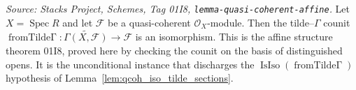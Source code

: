 \begin{lemma}
  \label{lem:qcoh_isIso_fromTildeGamma}
  \textit{Source: Stacks Project, Schemes, Tag 01I8, \texttt{lemma-quasi-coherent-affine}.}
  Let \(X = \operatorname{Spec} R\) and let \(\mathcal{F}\) be a quasi-coherent
  \(\mathcal{O}_X\)-module. Then the tilde--\(\Gamma\) counit
  \(\operatorname{fromTilde\Gamma} : \widetilde{\Gamma(X, \mathcal{F})} \to \mathcal{F}\) is an
  isomorphism. This is the affine structure theorem 01I8, proved here by checking the counit on the
  basis of distinguished opens. It is the unconditional instance that discharges the
  \(\operatorname{IsIso}(\operatorname{fromTilde\Gamma})\) hypothesis of
  Lemma~\ref{lem:qcoh_iso_tilde_sections}.
\end{lemma}
